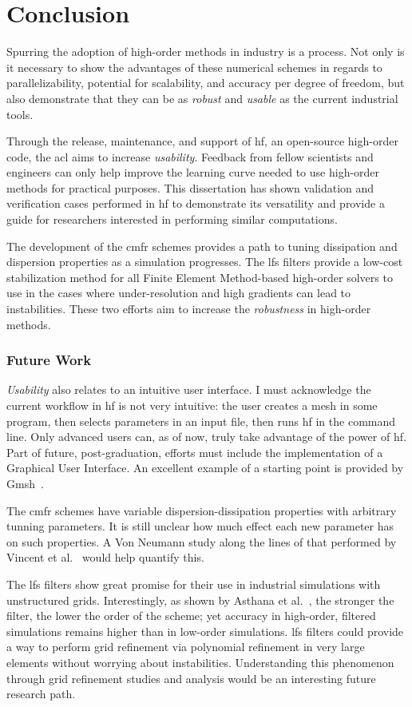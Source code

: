 \chapter{Conclusion}

Spurring the adoption of high-order methods in industry is a process. Not only is it necessary to show the advantages of these numerical schemes in regards to parallelizability, potential for scalability, and accuracy per degree of freedom, but also demonstrate that they can be as \emph{robust} and \emph{usable} as the current industrial tools.

Through the release, maintenance, and support of \gls{hf}, an open-source high-order code, the \gls{acl} aims to increase \emph{usability}. Feedback from fellow scientists and engineers can only help improve the learning curve needed to use high-order methods for practical purposes. This dissertation has shown validation and verification cases performed in \gls{hf} to demonstrate its versatility and provide a guide for researchers interested in performing similar computations.

The development of the \gls{cmfr} schemes provides a path to tuning dissipation and dispersion properties as a simulation progresses. The \gls{lfs} filters provide a low-cost stabilization method for all Finite Element Method-based high-order solvers to use in the cases where under-resolution and high gradients can lead to instabilities. These two efforts aim to increase the \emph{robustness} in high-order methods.

\subsection{Future Work}
\emph{Usability} also relates to an intuitive user interface. I must acknowledge the current workflow in \gls{hf} is not very intuitive: the user creates a mesh in some program, then selects parameters in an input file, then runs \gls{hf} in the command line. Only advanced users can, as of now, truly take advantage of the power of \gls{hf}. Part of future, post-graduation, efforts must include the implementation of a Graphical User Interface. An excellent example of a starting point is provided by Gmsh~\cite{geuzaine2009gmsh}.

The \gls{cmfr} schemes have variable dispersion-dissipation properties with arbitrary tunning parameters. It is still unclear how much effect each new parameter has on such properties. A Von Neumann study along the lines of that performed by Vincent et al.~\cite{vincent2011insights} would help quantify this.

The \gls{lfs} filters show great promise for their use in industrial simulations with unstructured grids. Interestingly, as shown by Asthana et al.~\cite{asthana2014}, the stronger the filter, the lower the order of the scheme; yet accuracy in high-order, filtered simulations remains higher than in low-order simulations. \gls{lfs} filters could provide a way to perform grid refinement via polynomial refinement in very large elements without worrying about instabilities. Understanding this phenomenon through grid refinement studies and analysis would be an interesting future research path.

